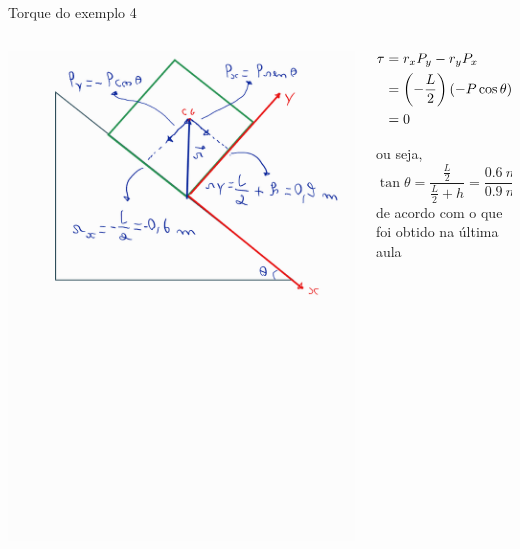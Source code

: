 \begin{frame}{Torque do exemplo 4}
    \begin{columns}
        \begin{column}{0.45\textwidth}
            \begin{center}
                \includegraphics[width=\textwidth, trim={0 280pt 0 0}, clip]{images/torque-x.pdf}
            \end{center}
        \end{column}

        \begin{column}{0.5\textwidth}
            \begin{align*}
                \tau &= r_x  P_y - r_y  P_x \\
                     &= \left(- \frac{L}{2}\right) \left( -P\cos{\theta}\right)-\left(\frac{L}{2}+h\right)\left(P\operatorname{sen}{\theta}\right) \\
                     &= 0
            \end{align*}

            ou seja,
            \[
                \tan{\theta} = \frac{\frac{L}{2}}{\frac{L}{2}+h}
                = \frac{\SI{0,6}{m}}{\SI{0,9}{m}}
                \implies \theta = \SI{33,7}{\degree}
            \]
            de acordo com o que foi obtido na última aula
        \end{column}
    \end{columns}

\end{frame}


